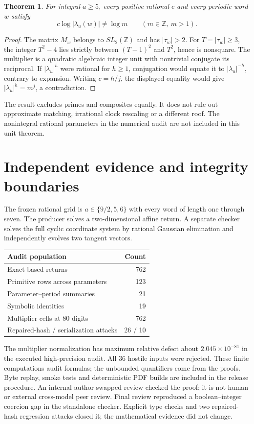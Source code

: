 \documentclass[10pt]{article}
\newtheorem{theorem}{Theorem}
\newcommand{\Z}{\mathbb Z}
\begin{document}
\begin{theorem}\label{unit}
For integral $a\ge5$, every positive rational $c$ and every periodic word
$w$ satisfy
\[
 c\log|\lambda_u(w)|\ne\log m\qquad(m\in\Z,\ m>1).
\]
\end{theorem}
\begin{proof}
The matrix $M_w$ belongs to $SL_2(\Z)$ and has $|\tau_w|>2$.
For $T=|\tau_w|\ge3$, the integer $T^2-4$ lies strictly between
$(T-1)^2$ and $T^2$, hence is nonsquare. The multiplier is a quadratic
algebraic integer unit with nontrivial conjugate its reciprocal.
If $|\lambda_u|^h$ were rational for $h\ge1$, conjugation would equate it
to $|\lambda_u|^{-h}$, contrary to expansion. Writing $c=h/j$,
the displayed equality would give $|\lambda_u|^h=m^j$, a contradiction.
\end{proof}
The result excludes primes and composites equally. It does not rule out
approximate matching, irrational clock rescaling or a different roof.
The nonintegral rational parameters in the numerical audit are not included
in this unit theorem.

\section{Independent evidence and integrity boundaries}
The frozen rational grid is $a\in\{9/2,5,6\}$ with every word of length
one through seven. The producer solves a two-dimensional affine return.
A separate checker solves the full cyclic coordinate system by rational
Gaussian elimination and independently evolves two tangent vectors.
\begin{center}
\begin{tabular}{lr}
\toprule
Audit population & Count\\\midrule
Exact based returns & 762\\
Primitive rows across parameters & 123\\
Parameter--period summaries & 21\\
Symbolic identities & 19\\
Multiplier cells at 80 digits & 762\\
Repaired-hash / serialization attacks & 26 / 10\\
\bottomrule
\end{tabular}
\end{center}
The multiplier normalization has maximum relative defect about
$2.045\times10^{-81}$ in the executed high-precision audit.
All 36 hostile inputs were rejected. These finite computations audit
formulas; the unbounded quantifiers come from the proofs.
Byte replay, smoke tests and deterministic PDF builds are included in the
release procedure. An internal author-swapped review checked the proof;
it is not human or external cross-model peer review.
Final review reproduced a boolean--integer coercion gap in the standalone
checker. Explicit type checks and two repaired-hash regression attacks
closed it; the mathematical evidence did not change.
\end{document}
